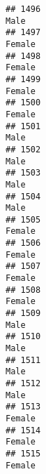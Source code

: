 \documentclass[]{article}
\begin{document}
\begin{verbatim}
## 1496                                                                                                                            Male
## 1497                                                                                                                          Female
## 1498                                                                                                                          Female
## 1499                                                                                                                          Female
## 1500                                                                                                                          Female
## 1501                                                                                                                            Male
## 1502                                                                                                                            Male
## 1503                                                                                                                            Male
## 1504                                                                                                                            Male
## 1505                                                                                                                          Female
## 1506                                                                                                                          Female
## 1507                                                                                                                          Female
## 1508                                                                                                                          Female
## 1509                                                                                                                            Male
## 1510                                                                                                                            Male
## 1511                                                                                                                            Male
## 1512                                                                                                                            Male
## 1513                                                                                                                          Female
## 1514                                                                                                                          Female
## 1515                                                                                                                          Female

\end{verbatim}
\end{document}
